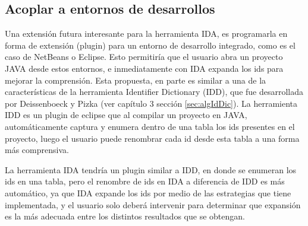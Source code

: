 \subsection{Acoplar a entornos de desarrollos}

Una extensión futura interesante para la herramienta IDA, es programarla en forma de extensión (plugin) para un entorno de desarrollo integrado, como es el caso de NetBeans o Eclipse. Esto permitiría que el usuario abra un proyecto JAVA desde estos entornos, e inmediatamente con IDA expanda los ids para mejorar la comprensión. Esta propuesta, en parte es similar a una de la características de la herramienta Identifier Dictionary (IDD), que fue desarrollada por Deissenboeck y Pizka (ver capítulo 3 sección \ref{sec:algIdDic}). La herramienta IDD es un plugin de eclipse que al compilar un proyecto en JAVA, automáticamente captura y enumera dentro de una tabla los ids presentes en el proyecto, luego el usuario puede renombrar cada id desde esta tabla a una forma más comprensiva.

La herramienta IDA tendría un plugin similar a IDD, en donde se enumeran los ids en una tabla, pero el renombre de ids en IDA a diferencia de IDD es más automático, ya que IDA expande los ids por medio de las estrategias que tiene implementada, y el usuario solo deberá intervenir para determinar que expansión es la más adecuada entre los distintos resultados que se obtengan.


